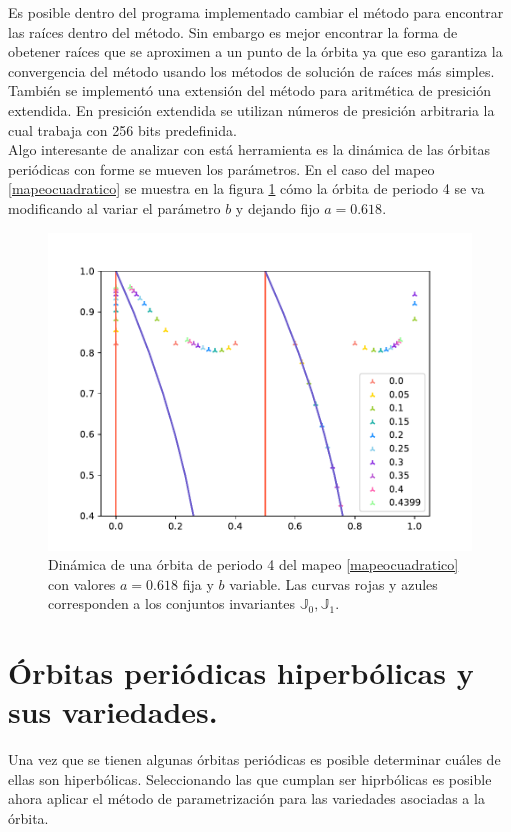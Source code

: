 Es posible dentro del programa implementado cambiar el m\'etodo para encontrar las ra\'ices dentro del m\'etodo. Sin embargo es mejor encontrar la forma de obetener ra\'ices que se aproximen a un punto de la \'orbita  ya que eso garantiza la convergencia del m\'etodo usando los m\'etodos de soluci\'on de ra\'ices m\'as simples. Tambi\'en se implement\'o una extensi\'on del m\'etodo para aritm\'etica de presici\'on extendida. En presici\'on extendida se utilizan n\'umeros de presici\'on arbitraria la cual trabaja con 256 bits predefinida. \\

Algo interesante de analizar con est\'a herramienta es la din\'amica de las \'orbitas peri\'odicas con forme se mueven los par\'ametros. En el caso del mapeo \eqref{mapeocuadratico} se muestra en la figura  \ref{grafmapeocuadraper4variable} c\'omo la \'orbita de periodo 4 se va modificando al variar el par\'ametro $b$ y dejando fijo $a=0.618$.

\begin{figure}
	\centering
	\includegraphics[scale=0.7]{MapeoCuadraP5b}
	\caption{Din\'amica de una \'orbita de periodo 4 del mapeo \eqref{mapeocuadratico} con valores $a=0.618$ fija y $b$ variable. Las curvas rojas y azules corresponden a los conjuntos invariantes $\mathbb{J}_{0}, \mathbb{J}_{1}$. }
	\label{grafmapeocuadraper4variable}
\end{figure}

\section{\'Orbitas peri\'odicas hiperb\'olicas y sus variedades.}
Una vez que se tienen algunas \'orbitas peri\'odicas es posible determinar cu\'ales de ellas son hiperb\'olicas. Seleccionando las que cumplan ser hiprb\'olicas es posible ahora aplicar el m\'etodo de parametrizaci\'on para las variedades asociadas a la \'orbita. \\

